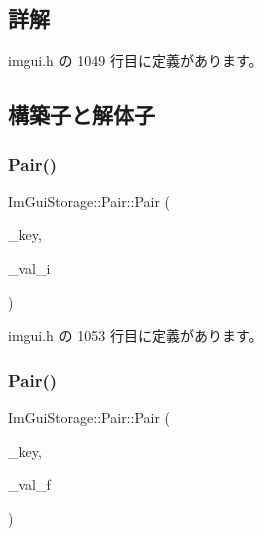 \subsection{詳解}


 imgui.\+h の 1049 行目に定義があります。



\subsection{構築子と解体子}
\mbox{\label{struct_im_gui_storage_1_1_pair_a37542a22048f0af35e5a6beda6900a0e}} 
\subsubsection{\texorpdfstring{Pair()}{Pair()}\hspace{0.1cm}{\footnotesize\ttfamily [1/3]}}
{\footnotesize\ttfamily Im\+Gui\+Storage\+::\+Pair\+::\+Pair (\begin{DoxyParamCaption}\item[{\mbox{\hyperlink{imgui_8h_a1785c9b6f4e16406764a85f32582236f}{Im\+Gui\+ID}}}]{\+\_\+key,  }\item[{int}]{\+\_\+val\+\_\+i }\end{DoxyParamCaption})\hspace{0.3cm}{\ttfamily [inline]}}



 imgui.\+h の 1053 行目に定義があります。

\mbox{\label{struct_im_gui_storage_1_1_pair_a6f63f598513f2a7a57f2e9ea3b0137b9}} 
\subsubsection{\texorpdfstring{Pair()}{Pair()}\hspace{0.1cm}{\footnotesize\ttfamily [2/3]}}
{\footnotesize\ttfamily Im\+Gui\+Storage\+::\+Pair\+::\+Pair (\begin{DoxyParamCaption}\item[{\mbox{\hyperlink{imgui_8h_a1785c9b6f4e16406764a85f32582236f}{Im\+Gui\+ID}}}]{\+\_\+key,  }\item[{float}]{\+\_\+val\+\_\+f }\end{DoxyParamCaption})\hspace{0.3cm}{\ttfamily [inline]}}



